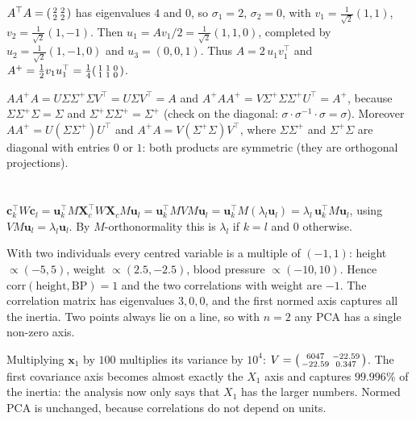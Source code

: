 $A^\top A = \begin{psmallmatrix}2&2\\2&2\end{psmallmatrix}$ has eigenvalues $4$ and $0$, so $\sigma_1 = 2$, $\sigma_2 = 0$, with
$v_1 = \frac1{\sqrt2}(1,1)$, $v_2 = \frac1{\sqrt2}(1,-1)$. Then $u_1 = Av_1/2 = \frac1{\sqrt2}(1,1,0)$, completed by
$u_2 = \frac1{\sqrt2}(1,-1,0)$ and $u_3 = (0,0,1)$. Thus $A = 2\,u_1v_1^\top$ and
$A^+ = \frac12v_1u_1^\top = \frac14\begin{psmallmatrix}1&1&0\\1&1&0\end{psmallmatrix}$.

$AA^+A = U\Sigma\Sigma^+\Sigma V^\top = U\Sigma V^\top = A$ and $A^+AA^+ = V\Sigma^+\Sigma\Sigma^+U^\top = A^+$, because
$\Sigma\Sigma^+\Sigma = \Sigma$ and $\Sigma^+\Sigma\Sigma^+ = \Sigma^+$ (check on the diagonal: $\sigma\cdot\sigma^{-1}\cdot\sigma = \sigma$). Moreover
$AA^+ = U(\Sigma\Sigma^+)U^\top$ and $A^+A = V(\Sigma^+\Sigma)V^\top$, where $\Sigma\Sigma^+$ and $\Sigma^+\Sigma$ are diagonal with
entries $0$ or $1$: both products are symmetric (they are orthogonal projections).

\section{}

$\mathbf c_k^\top W\mathbf c_l = \mathbf u_k^\top M\mathbf X_c^\top W\mathbf X_cM\mathbf u_l = \mathbf u_k^\top MVM\mathbf u_l = \mathbf u_k^\top M(\lambda_l\mathbf u_l) = \lambda_l\,\mathbf u_k^\top M\mathbf u_l$,
using $VM\mathbf u_l = \lambda_l\mathbf u_l$. By $M$-orthonormality this is $\lambda_l$ if $k = l$ and $0$ otherwise.

With two individuals every centred variable is a multiple of $(-1, 1)$: height $\propto(-5,5)$, weight
$\propto(2.5,-2.5)$, blood pressure $\propto(-10,10)$. Hence $\mathrm{corr}(\text{height},\text{BP}) = 1$ and the two
correlations with weight are $-1$. The correlation matrix has eigenvalues $3, 0, 0$, and the first normed axis
captures all the inertia. Two points always lie on a line, so with $n = 2$ any PCA has a single non-zero axis.

Multiplying $\mathbf x_1$ by $100$ multiplies its variance by $10^4$:
$V = \begin{psmallmatrix}6047 & -22.59\\ -22.59 & 0.347\end{psmallmatrix}$. The first covariance axis becomes almost exactly the
$X_1$ axis and captures $99.996\%$ of the inertia: the analysis now only says that $X_1$ has the larger
numbers. Normed PCA is unchanged, because correlations do not depend on units.

